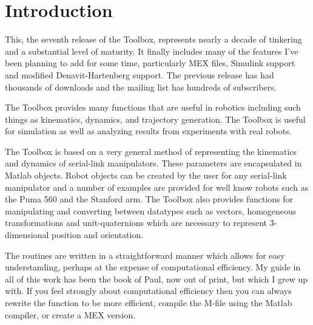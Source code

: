 \documentclass{article}
\begin{document}
\renewcommand{\baselinestretch}{1.2}        %

\newpage
{}
\vskip 4mm
\vskip 2mm
\moveleft 1.25in\vbox{}
\setcounter{section}{0}
\vskip 5mm

\section{Introduction}
This, the seventh release of the Toolbox, represents nearly a decade of
tinkering and a substantial level of maturity.  It finally includes many of
the features I've been planning to add for some time, particularly MEX files,
Simulink support and modified Denavit-Hartenberg support.
The previous release has had thousands of downloads and the mailing list 
has hundreds of subscribers.

The Toolbox provides many functions that are useful in robotics
including such things as kinematics, dynamics, and  trajectory generation.
The Toolbox is useful for simulation as well as analyzing results from
experiments with real robots.

The Toolbox is based on a very general method of representing the kinematics
and dynamics of serial-link manipulators.
These parameters  are encapsulated in Matlab objects.  Robot objects
can be created by the user for any serial-link manipulator and a number
of examples are provided for well know robots such as the Puma 560 and the
Stanford arm.
The Toolbox also provides functions for manipulating and converting
between datatypes such
as vectors, homogeneous transformations and unit-quaternions which are necessary
to represent 3-dimensional position and orientation.

The routines are written in a straightforward manner which allows
for easy understanding, perhaps at the expense of computational efficiency.
My guide in all of this work has been the book of Paul\cite{Paul81a}, now
out of print, but which I grew up with.
If you feel strongly about computational efficiency then you can always
rewrite the function to be more efficient,
compile the M-file using the Matlab compiler, or
create a MEX version.
\end{document}
